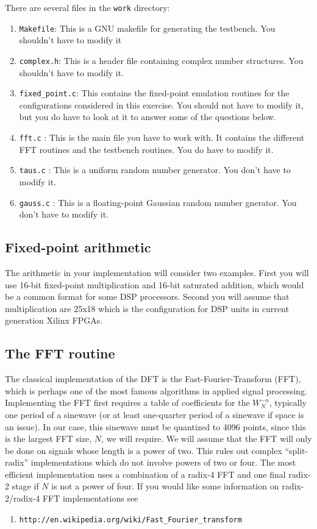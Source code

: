 \documentclass[11pt]{article}
\begin{document}
There are several files in the {\tt work} directory:
\begin{enumerate}
\item {\tt Makefile}: This is a GNU makefile for generating the testbench. You shouldn't have to modify it
\item {\tt complex.h}:  This is a header file containing complex number structures.  You shouldn't have to modify it.
\item {\tt fixed\_point.c}: This contains the fixed-point emulation routines for the configurations considered in this exercise.  You should not have to modify it, but you do have to look at it to answer some of the questions below.
\item {\tt fft.c} : This is the main file you have to work with.  It contains the different FFT routines and the testbench routines.  You do have to modify it.
\item {\tt taus.c} : This is a uniform random number generator.  You don't have to modify it.
\item {\tt gauss.c} : This is a floating-point Gaussian random number gnerator.  You don't have to modify it. 
\end{enumerate}

\subsection{Fixed-point arithmetic}
The arithmetic in your implementation will consider two examples.  First you will use 16-bit fixed-point multiplication and 
16-bit saturated addition, which would be a common format for some DSP processors. Second you will assume that multiplication are
25x18 which is the configuration for DSP units in current generation Xilinx FPGAs.


\subsection{The FFT routine}
The classical implementation of the DFT is the Fast-Fourier-Transform (FFT), which is perhaps one of the most
famous algorithms in applied signal processing.  Implementing the FFT first requires a table of coefficients for the $W_N^{-n}$, 
typically one period of a sinewave (or at least one-quarter period of a sinewave if space is an issue).  In our case, 
this sinewave must be quantized to 4096 points, since this is the largest FFT size, $N$, we will require.  We will assume that 
the FFT will only be done on signals whose length is a power of two.  This rules out complex ``split-radix'' implementations 
which do not involve powers of two or four.  The most efficient implementation uses a combination of a radix-4 FFT and one final 
radix-2 stage if $N$ is not a power of four.  If you would like some information on radix-2/radix-4 FFT implementations 
see \par
\begin{small}
\begin{enumerate}
\item {\tt http://en.wikipedia.org/wiki/Fast\_Fourier\_transform}
\end{enumerate}
\end{small}
\end{document}
